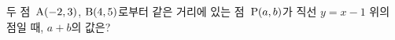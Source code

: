두 점~$\mathrm{A}(-2{,}\mkern3mu\mathopen{}3)$, $\mathrm{B}(4{,}\mkern3mu\mathopen{}5)$로부터 같은 거리에 있는 점~$\mathrm{P}(a{,}\mkern3mu\mathopen{}b)$가 직선 $y=x-1$ 위의 점일 때, $a+b$의 값은?
